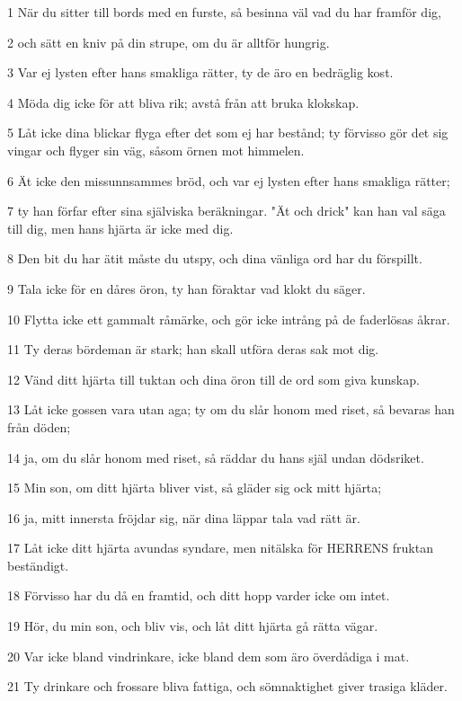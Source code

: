 \par 1 När du sitter till bords med en furste, så besinna väl vad du har framför dig,
\par 2 och sätt en kniv på din strupe, om du är alltför hungrig.
\par 3 Var ej lysten efter hans smakliga rätter, ty de äro en bedräglig kost.
\par 4 Möda dig icke för att bliva rik; avstå från att bruka klokskap.
\par 5 Låt icke dina blickar flyga efter det som ej har bestånd; ty förvisso gör det sig vingar och flyger sin väg, såsom örnen mot himmelen.
\par 6 Ät icke den missunnsammes bröd, och var ej lysten efter hans smakliga rätter;
\par 7 ty han förfar efter sina själviska beräkningar. "Ät och drick" kan han val säga till dig, men hans hjärta är icke med dig.
\par 8 Den bit du har ätit måste du utspy, och dina vänliga ord har du förspillt.
\par 9 Tala icke för en dåres öron, ty han föraktar vad klokt du säger.
\par 10 Flytta icke ett gammalt råmärke, och gör icke intrång på de faderlösas åkrar.
\par 11 Ty deras bördeman är stark; han skall utföra deras sak mot dig.
\par 12 Vänd ditt hjärta till tuktan och dina öron till de ord som giva kunskap.
\par 13 Låt icke gossen vara utan aga; ty om du slår honom med riset, så bevaras han från döden;
\par 14 ja, om du slår honom med riset, så räddar du hans själ undan dödsriket.
\par 15 Min son, om ditt hjärta bliver vist, så gläder sig ock mitt hjärta;
\par 16 ja, mitt innersta fröjdar sig, när dina läppar tala vad rätt är.
\par 17 Låt icke ditt hjärta avundas syndare, men nitälska för HERRENS fruktan beständigt.
\par 18 Förvisso har du då en framtid, och ditt hopp varder icke om intet.
\par 19 Hör, du min son, och bliv vis, och låt ditt hjärta gå rätta vägar.
\par 20 Var icke bland vindrinkare, icke bland dem som äro överdådiga i mat.
\par 21 Ty drinkare och frossare bliva fattiga, och sömnaktighet giver trasiga kläder.
